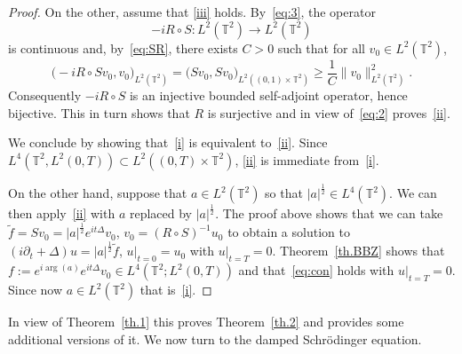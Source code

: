 \documentclass[11pt]{article}
\theoremstyle{definition}
\numberwithin{equation}{section}
\numberwithin{figure}{section}
\numberwithin{table}{section}
\newcommand{\TT}{{\mathbb T}}
\begin{document}
\begin{proof}
On the other, assume that {\eqref{iii}} holds. By~\eqref{eq:3}, the operator
\[
-i R \circ S : L^2(\TT^2) \rightarrow L^2(\TT^2)
\]
is continuous and,
by~\eqref{eq:SR}, there exists $ C > 0 $ such that for all $ v_0 \in L^2(\TT^2) $,
\[
\bigl(-i R \circ S v_0, v_0 \bigr) _{L^2(\TT^2)} = \bigl(Sv_0, S v_0\bigr)_{L^2((0,1) \times \TT^2) } \geq \frac 1 C \| v_0 \|_{L^2(\TT^2)}^2.
\]
Consequently $ -i R \circ S $ is an injective bounded self-adjoint operator, hence bijective. This in turn shows that $R$ is surjective and in view of~\eqref{eq:2} proves~\eqref{ii}.

We conclude by showing that~\eqref{i} is equivalent to~\eqref{ii}. Since $ L^4 (\TT^2, L^2 (0, T)) \subset L^2 ((0, T) \times
\TT^2)$, \eqref{ii} is immediate from~\eqref{i}.

On the other hand, suppose that $ a \in L^2 (\TT^2) $ so that $ |a|^{\frac12} \in L^4 (\TT^2) $. We can then apply~\eqref{ii} with $ a $ replaced by $ |a|^{\frac12 } $. The proof above shows that we can take $ \tilde f = Sv_0 = |a|^{\frac12} e^{it \Delta} v_0$, $ v_0 = (R \circ S)^{-1} u_0 $ to obtain a solution to $ (i \partial_t + \Delta) u = |a|^{\frac12} \tilde f $, $ u|_{t=0} = u_0 $ with $ u |_{t=T}=0 $. Theorem~\ref{th.BBZ} shows that $ f := e^{ i \arg(a)} e^{it \Delta} v_0 \in L^4(\TT^2; L^2(0,T)) $ and that~\eqref{eq:con} holds with $ u |_{t=T}=0 $. Since now $ a \in L^2 (\TT^2) $ that is~\eqref{i}.
\end{proof}

In view of Theorem~\ref{th.1} this proves Theorem~\ref{th.2} and provides some additional versions of it. We now turn to the damped Schrödinger equation.
\end{document}
